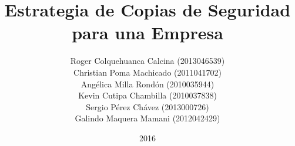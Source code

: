 \documentclass[a4paper,20pt]{report}
\title{Estrategia de Copias de Seguridad para una Empresa}
\author{
Roger Colquehuanca Calcina (2013046539)\\
Christian Poma Machicado (2011041702)\\
Angélica Milla Rondón (2010035944)\\
Kevin Cutipa Chambilla (2010037838)\\
Sergio Pérez Chávez (2013000726)\\
Galindo Maquera Mamani (2012042429)\\
}
\date{2016}
\begin{document}
\maketitle 
\doublespacing

\tableofcontents %

\listoftables %
\listoffigures %







\renewcommand{\bibname}{BIBLIOGRAFIA}



\renewcommand\appendixname{Anexo}
\appendix

\end{document}
